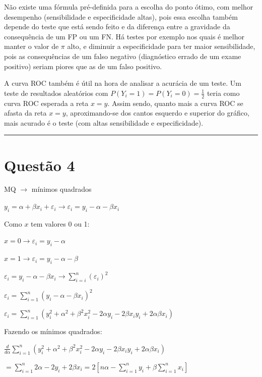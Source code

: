 \documentclass[11pt,]{article}
\begin{document}
Não existe uma fórmula pré-definida para a escolha do ponto ótimo, com
melhor desempenho (sensibilidade e especificidade altas), pois essa
escolha também depende do teste que está sendo feito e da diferença
entre a gravidade da consequência de um FP ou um FN. Há testes por
exemplo nos quais é melhor manter o valor de \(\pi\) alto, e diminuir a
especificidade para ter maior sensibilidade, pois as consequências de um
falso negativo (diagnóstico errado de um exame positivo) seriam piores
que as de um falso positivo.

A curva ROC também é útil na hora de analisar a acurácia de um teste. Um
teste de resultados aleatórios com
\(P(Y_{i}=1)=P(Y_{i}=0)= \frac{1}{2}\) teria como curva ROC esperada a
reta \(x=y\). Assim sendo, quanto mais a curva ROC se afasta da reta
\(x=y\), aproximando-se dos cantos esquerdo e superior do gráfico, mais
acurado é o teste (com altas sensibilidade e especificidade).

\begin{center}\rule{0.5\linewidth}{\linethickness}\end{center}

\section{Questão 4}\label{questao-4}

MQ \(\rightarrow\) mínimos quadrados

\(y_{i}= \alpha + \beta x_{i} + \varepsilon_{i} \rightarrow \varepsilon_{i} = y_{i} - \alpha - \beta x_{i}\)

Como \(x\) tem valores 0 ou 1:

\(x = 0 \rightarrow \varepsilon_{i} = y_{i}- \alpha\)

\(x= 1 \rightarrow \varepsilon_{i} = y_{i} - \alpha - \beta\)

\(\varepsilon_{i} = y_{i} - \alpha - \beta x_{i} \rightarrow \sum_{i=i}^n ( \varepsilon_{i})^2\)

\(\varepsilon_{i} = \sum_{i=1}^n ( y_{i} - \alpha - \beta x_{i} )^2\)

\(\varepsilon_{i} = \sum_{i=1}^n (y_{i}^2 + \alpha^2 + \beta^2 x_{i}^2 - 2 \alpha y_{i} - 2 \beta x_{i} y_{i} + 2 \alpha \beta x_{i})\)

Fazendo os mínimos quadrados:

\(\frac{d}{d\alpha} \sum_{i=1}^n ( y_{i}^2 + \alpha^2 + \beta^2 x_{i}^2 - 2 \alpha y_{i} - 2 \beta x_{i} y_{i} + 2 \alpha \beta x_{i})\)

\(= \sum_{i=1}^n 2 \alpha - 2 y_{i} + 2 \beta x_{i} = 2 [n \alpha - \sum_{i=1}^n y_{i} + \beta \sum_{i=1}^n x_{i}]\)
\end{document}
